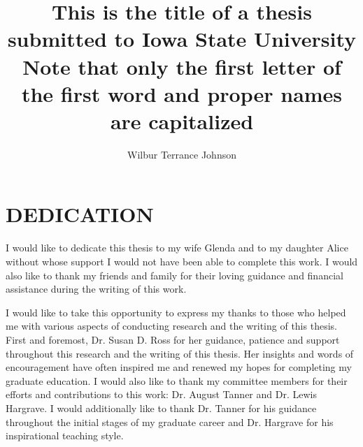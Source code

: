 \documentclass[11pt]{isuthesis}
\begin{document}
\title{This is the title of a thesis
submitted to Iowa State University\\
Note that only the first letter of
the first word and proper names
are capitalized}
\author{Wilbur Terrance Johnson}
\notice
\maketitle

\chapter*{DEDICATION}

I would like to dedicate this thesis to my wife Glenda and
to my daughter Alice without whose support I would not have
been able to complete this work.
I would also like to thank my friends and family for their loving guidance and
financial assistance during the writing of this work.

\tableofcontents
{} \cleardoublepage {}
{}
\listoftables
\cleardoublepage {} {}
\listoffigures
\cleardoublepage {}
{}

I would like to take this opportunity to express my thanks to those
who helped me with various aspects of conducting research and the writing
of this thesis.
First and foremost, Dr. Susan D. Ross for her guidance, patience and support
throughout this research and the writing of this thesis.
Her insights and words of encouragement have often inspired me and renewed
my hopes for completing my graduate education.
I would also like to thank my committee members for their efforts
and contributions to this work: Dr. August Tanner and
Dr. Lewis Hargrave.
I would additionally like to thank
Dr. Tanner for his guidance throughout the initial stages of my
graduate career and Dr. Hargrave for his inspirational teaching style.
\end{document}
